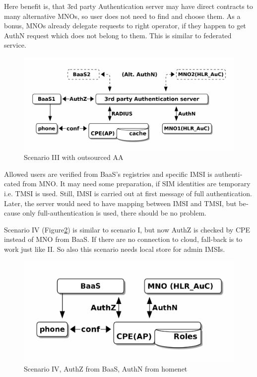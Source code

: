 \documentclass[12pt,a4paper,english]{tutthesis}
\begin{document}
\begin{otherlanguage}{english}
Here benefit is, that 3rd party Authentication server may have direct
contracts to many alternative MNOs, so user does not need to find and choose
them. As a bonus,  MNOs already delegate requests to right operator, if
they happen to get AuthN request which does not belong to them.
This is similar to federated service.

\begin{figure}[htb]
\centering
\includegraphics[width=.9\linewidth]{scenIII.png}
\caption{\label{fig:scenario-III}Scenario III with outsourced AA}
\end{figure}

Allowed users are verified from BaaS's registries and specific IMSI is
authenticated from MNO.  It may need some preparation, if SIM
identities are temporary i.e. TMSI is used.  Still, IMSI is carried out at first message
of full authentication. Later, the server would need to have mapping
between IMSI and TMSI, but because only full-authentication is used,
there should be no problem.


\label{scenario-iv} 


Scenario IV (Figure\ref{fig:scenario-IV}) is similar to scenario I, but
now AuthZ is checked by CPE instead of MNO from BaaS. If there are no connection to
cloud, fall-back is to work just like II. So also this scenario needs local
store for admin IMSIs.

\begin{figure}[htb]
\centering
\includegraphics[width=.9\linewidth]{scenIV.png}
\caption{\label{fig:scenario-IV}Scenario IV, AuthZ from BaaS, AuthN from homenet}
\end{figure}


\end{otherlanguage}
\end{document}
